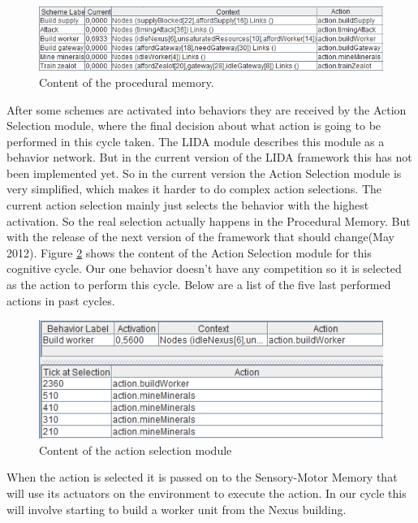 \begin{figure}[h!tb]
\centering
\includegraphics[width=\textwidth]{graphics/procedural_memory.png}
\caption{Content of the procedural memory.}
\label{fig:proceduralmemory}
\end{figure}

After some schemes are activated into behaviors they are received by the Action Selection module, where the final decision about what action is going to be performed in this cycle taken. The LIDA module describes this module as a behavior network\cite{maes1989right}. But in the current version of the LIDA framework this has not been implemented yet. So in the current version the Action Selection module is very simplified, which makes it harder to do complex action selections. The current action selection mainly just selects the behavior with the highest activation. So the real selection actually happens in the Procedural Memory. But with the release of the next version of the framework that should change(May 2012). Figure \ref{fig:actionselection} shows the content of the Action Selection module for this cognitive cycle. Our one behavior doesn't have any competition so it is selected as the action to perform this cycle. Below are a list of the five last performed actions in past cycles.

\begin{figure}[h!tb]
\centering
\includegraphics[scale=1.0]{graphics/action_selection.png}
\caption{Content of the action selection module}
\label{fig:actionselection}
\end{figure}

When the action is selected it is passed on to the Sensory-Motor Memory that will use its actuators on the environment to execute the action. In our cycle this will involve starting to build a worker unit from the Nexus building.
